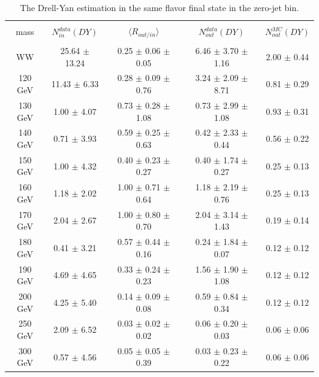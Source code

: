 \begin{table}
\begin{center}
\begin{tabular}{c c c c c}
\hline
\vspace{-3mm} && \\
mass   & $N_{in}^{data}(DY)$ & $\langle R_{out/in} \rangle$ & $N_{out}^{data}(DY)$ & $N_{out}^{MC}(DY)$ \\
\vspace{-3mm} && \\
\hline
WW & 25.64 $\pm$ 13.24 & 0.25 $\pm$ 0.06 $\pm$ 0.05 & 6.46 $\pm$ 3.70 $\pm$ 1.16 & 2.00 $\pm$ 0.44 \\   
\hline
120 GeV & 11.43 $\pm$ 6.33  & 0.28 $\pm$ 0.09 $\pm$ 0.76 & 3.24 $\pm$ 2.09 $\pm$ 8.71 & 0.81 $\pm$ 0.29 \\   
130 GeV & 1.00 $\pm$ 4.07   & 0.73 $\pm$ 0.28 $\pm$ 1.08 & 0.73 $\pm$ 2.99 $\pm$ 1.08 & 0.93 $\pm$ 0.31 \\   
140 GeV & 0.71 $\pm$ 3.93   & 0.59 $\pm$ 0.25 $\pm$ 0.63 & 0.42 $\pm$ 2.33 $\pm$ 0.44 & 0.56 $\pm$ 0.22 \\   
150 GeV & 1.00 $\pm$ 4.32   & 0.40 $\pm$ 0.23 $\pm$ 0.27 & 0.40 $\pm$ 1.74 $\pm$ 0.27 & 0.25 $\pm$ 0.13 \\       
160 GeV & 1.18 $\pm$ 2.02   & 1.00 $\pm$ 0.71 $\pm$ 0.64 & 1.18 $\pm$ 2.19 $\pm$ 0.76 & 0.25 $\pm$ 0.13 \\     
170 GeV & 2.04 $\pm$ 2.67   & 1.00 $\pm$ 0.80 $\pm$ 0.70 & 2.04 $\pm$ 3.14 $\pm$ 1.43 & 0.19 $\pm$ 0.14 \\          
180 GeV & 0.41 $\pm$ 3.21   & 0.57 $\pm$ 0.44 $\pm$ 0.16 & 0.24 $\pm$ 1.84 $\pm$ 0.07 & 0.12 $\pm$ 0.12 \\         
190 GeV & 4.69 $\pm$ 4.65   & 0.33 $\pm$ 0.24 $\pm$ 0.23 & 1.56 $\pm$ 1.90 $\pm$ 1.08 & 0.12 $\pm$ 0.12 \\          
200 GeV & 4.25 $\pm$ 5.40   & 0.14 $\pm$ 0.09 $\pm$ 0.08 & 0.59 $\pm$ 0.84  $\pm$ 0.34 & 0.12 $\pm$ 0.12 \\             
250 GeV & 2.09 $\pm$ 6.52   & 0.03 $\pm$ 0.02 $\pm$ 0.02 & 0.06 $\pm$ 0.20 $\pm$ 0.03 & 0.06 $\pm$ 0.06 \\          
300 GeV & 0.57 $\pm$ 4.56   & 0.05 $\pm$ 0.05 $\pm$ 0.39 & 0.03 $\pm$ 0.23 $\pm$ 0.22 & 0.06 $\pm$ 0.06 \\
\hline
\end{tabular}
\caption{The Drell-Yan estimation in the same flavor final state in the zero-jet bin.
\label{tab:routin_data_zeroj}}
\end{center}
\end{table}



